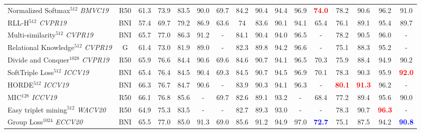 \documentclass{article}
\begin{document}
\begin{table*}
{\begin{tabular}{@{}l|c|ccccc|ccccc|cccc@{}}
Normalized Softmax$^{512}$ \cite{DBLP:journals/corr/abs-1811-12649} \textit{BMVC19} & R50 & 61.3 & 73.9 & 83.5 & 90.0 & 69.7 &  84.2 & 90.4 & 94.4 & 96.9 & \textbf{\textcolor{red}{74.0}} & 78.2 & 90.6 & 96.2 & 91.0 \\

RLL-H$^{512}$  \cite{DBLP:conf/cvpr/WangHKHGR19} \textit{CVPR19} & BNI & 57.4 & 69.7 & 79.2 & 86.9 & 63.6 & 74 & 83.6 & 90.1 & 94.1 &   65.4 &   76.1 & 89.1 & 95.4 & 89.7 \\

Multi-similarity$^{512}$  \cite{DDBLP:conf/cvpr/Wand2019} \textit{CVPR19} & BNI & 65.7 & 77.0 & 86.3 & 91.2 & - &  84.1 & 90.4 & 94.0 & 96.5 & - & 78.2 & 90.5 & 96.0 & - \\ 

Relational Knowledge$^{512}$ \cite{DBLP:conf/cvpr/Park2019} \textit{CVPR19} & G & 61.4 & 73.0 & 81.9 & 89.0 & - &  82.3 & 89.8 & 94.2 & 96.6 & - & 75.1 & 88.3 & 95.2  & -\\ 

Divide and Conquer$^{1028}$  \cite{DDBLP:conf/cvpr/Sanakoyeu2019} \textit{CVPR19} & R50 & 65.9 & 76.6 & 84.4 & 90.6 & 69.6 & 84.6 & 90.7 & 94.1 & 96.5 &  70.3 &   75.9   & 88.4 & 94.9 &90.2 \\ 



SoftTriple Loss$^{512}$ \cite{DBLP:journals/corr/abs-1909-05235} \textit{ICCV19} & BNI & 65.4 & 76.4 & 84.5 & 90.4 & 69.3 & 84.5 & 90.7 & 94.5 & 96.9 & 70.1 & 78.3 & 90.3 & 95.9 & \textbf{\textcolor{red}{92.0}} \\

HORDE$^{512}$ \cite{DBLP:journals/corr/abs-1908-02735} \textit{ICCV19} & BNI & 66.3 & 76.7 & 84.7 & 90.6 & -  & 83.9 & 90.3 & 94.1 & 96.3 & -  & \textbf{\textcolor{red}{80.1}} & \textbf{\textcolor{red}{91.3}} & 96.2 & -\\

MIC$^{128}$ \cite{DBLP:conf/iccv/BrattoliRO19} \textit{ICCV19} & R50 & 66.1 & 76.8 & 85.6 & - & 69.7 & 82.6 & 89.1 & 93.2 & - & 68.4 & 77.2 & 89.4 & 95.6 & 90.0  \\

Easy triplet mining$^{512}$ \cite{DBLP:conf/wacv/XuanSP20} \textit{WACV20} & R50 & 64.9 & 75.3 & 83.5 & - & - & 82.7 & 89.3 & 93.0 & - & - & 78.3 & 90.7 & \textbf{\textcolor{red}{96.3}} & - \\   

Group Loss$^{1024}$ \cite{DBLP:conf/eccv/GrLoss} \textit{ECCV20} & BNI & 65.5 & 77.0 & 85.0 & 91.3 & 69.0 & 85.6 & 91.2 & 94.9 & 97.0 & \textbf{\textcolor{blue}{72.7}} & 75.1 & 87.5 & 94.2 & \textbf{\textcolor{blue}{90.8}} \\


\end{tabular}}
\end{table*}
\end{document}
